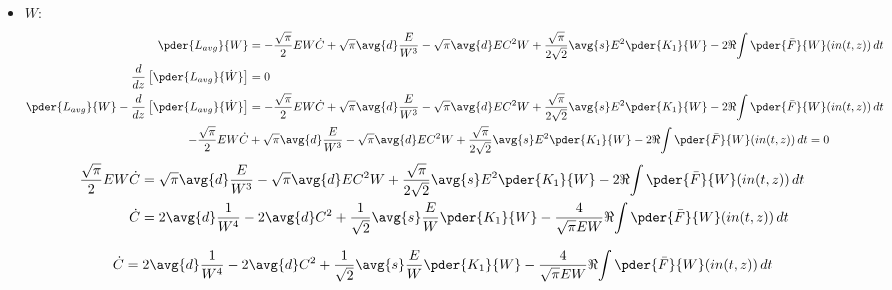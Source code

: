 \begin{itemize}
\begin{equation}
\begin{split}
 \dot{\Omega} =  - \frac{2}{\sqrt{\pi}E }\left[\Re{\int \pder{\bar{F}}{T} (in(t,z))\,dt}  + \Omega\Re{\int \pder{\bar{F}}{\phi} (in(t,z))\,dt}\right] \\
\end{split}
\end{equation}


\item $W$:
\begin{equation}
\begin{split}
\pder{L_{avg}}{W} &= -\frac{\sqrt{\pi}}{2} E W\dot{C} + \sqrt{\pi}  \avg{d} \frac{E}{W^3}  - \sqrt{\pi} \avg{d} E C^2 W  + \frac{\sqrt{\pi}}{2\sqrt{2}} \avg{s}  E^2 \pder{K_1}{W} - 2\Re{\int \pder{\bar{F}}{W} (in(t,z))\,dt}\\
\frac{d}{dz}\left[\pder{L_{avg}}{\dot{W}}\right] &= 0\\
\pder{L_{avg}}{W} - \frac{d}{dz}\left[\pder{L_{avg}}{\dot{W}}\right] &= -\frac{\sqrt{\pi}}{2} E W\dot{C} + \sqrt{\pi}  \avg{d} \frac{E}{W^3}  - \sqrt{\pi}\avg{d} E C^2 W + \frac{\sqrt{\pi}}{2\sqrt{2}} \avg{s}  E^2 \pder{K_1}{W} - 2\Re{\int \pder{\bar{F}}{W} (in(t,z))\,dt}\\
-\frac{\sqrt{\pi}}{2} E W\dot{C} &+ \sqrt{\pi}  \avg{d} \frac{E}{W^3}  - \sqrt{\pi} \avg{d} E C^2 W  + \frac{\sqrt{\pi}}{2\sqrt{2}}\avg{s} E^2\pder{K_1}{W}  - 2\Re{\int \pder{\bar{F}}{W} (in(t,z))\,dt} = 0  \\
\end{split}
\end{equation}
\begin{equation}
\begin{split}
\frac{\sqrt{\pi}}{2} E W\dot{C} &= \sqrt{\pi}  \avg{d} \frac{E}{W^3}  - \sqrt{\pi} \avg{d} E C^2 W  + \frac{\sqrt{\pi}}{2\sqrt{2}}\avg{s} E^2\pder{K_1}{W}  - 2\Re{\int \pder{\bar{F}}{W} (in(t,z))\,dt}   \\
\dot{C} &= 2 \avg{d} \frac{1}{W^4}  - 2 \avg{d} C^2 + \frac{1}{\sqrt{2}}\avg{s} \frac{E}{W} \pder{K_1}{W}  - \frac{4}{\sqrt{\pi}EW}\Re{\int \pder{\bar{F}}{W} (in(t,z))\,dt}   \\
\end{split}
\end{equation}

\begin{equation}
\begin{split}
\dot{C} &= 2 \avg{d} \frac{1}{W^4}  - 2 \avg{d} C^2 + \frac{1}{\sqrt{2}}\avg{s} \frac{E}{W} \pder{K_1}{W}  - \frac{4}{\sqrt{\pi}EW}\Re{\int \pder{\bar{F}}{W} (in(t,z))\,dt}  \\
\end{split}
\end{equation}


\end{itemize}
